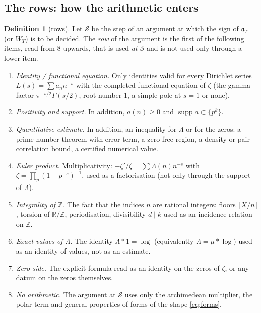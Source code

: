 \documentclass[11pt]{amsart}
\theoremstyle{definition}
\newtheorem{definition}[theorem]{Definition}
\theoremstyle{remark}
\newcommand{\R}{\mathbb R}
\newcommand{\Z}{\mathbb Z}
\newcommand{\supp}{\operatorname{supp}}
\begin{document}
\subsection{The rows: how the arithmetic enters}
\begin{definition}[rows]\label{def:rows}
Let $\mathcal S$ be the step of an argument at which the sign of $\mathfrak a_T$ (or $W_T$) is to be
decided. The \emph{row} of the argument is the first of the following items, read from 8 upwards, that
is used \emph{at $\mathcal S$} and is not used only through a lower item.
\begin{enumerate}
\item[\textbf{1.}] \emph{Identity / functional equation.} Only identities valid for every Dirichlet series
 $L(s)=\sum a_nn^{-s}$ with the completed functional equation of $\zeta$ (the gamma factor
 $\pi^{-s/2}\Gamma(s/2)$, root number $1$, a simple pole at $s=1$ or none).
\item[\textbf{2.}] \emph{Positivity and support.} In addition, $a(n)\ge0$ and
 $\supp a\subset\{p^k\}$.
\item[\textbf{3.}] \emph{Quantitative estimate.} In addition, an inequality for $\Lambda$ or for the
 zeros: a prime number theorem with error term, a zero-free region, a density or pair-correlation
 bound, a certified numerical value.
\item[\textbf{4.}] \emph{Euler product.} Multiplicativity: $-\zeta'/\zeta=\sum\Lambda(n)n^{-s}$ with
 $\zeta=\prod_p(1-p^{-s})^{-1}$, used as a factorisation (not only through the support of $\Lambda$).
\item[\textbf{5.}] \emph{Integrality of $\Z$.} The fact that the indices $n$ are rational integers:
 floors $\lfloor X/n\rfloor$, torsion of $\R/\Z$, periodisation, divisibility $d\mid k$ used as an
 incidence relation on $\Z$.
\item[\textbf{6.}] \emph{Exact values of $\Lambda$.} The identity $\Lambda*1=\log$ (equivalently
 $\Lambda=\mu*\log$) used as an identity of values, not as an estimate.
\item[\textbf{7.}] \emph{Zero side.} The explicit formula read as an identity on the zeros of $\zeta$,
 or any datum on the zeros themselves.
\item[\textbf{8.}] \emph{No arithmetic.} The argument at $\mathcal S$ uses only the archimedean
 multiplier, the polar term and general properties of forms of the shape \eqref{eq:forms}.
\end{enumerate}
\end{definition}
\end{document}
